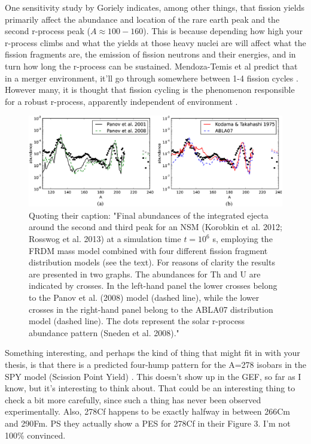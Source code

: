 One sensitivity study by Goriely \cite{Goriely2015a} indicates, among other things, that fission yields primarily affect the abundance and location of the rare earth peak and the second r-process peak ($A\approx100-160$). This is because depending how high your r-process climbs and what the yields at those heavy nuclei are will affect what the fission fragments are, the emission of fission neutrons and their energies, and in turn how long the r-process can be sustained. Mendoza-Temis et al predict that in a merger environment, it'll go through somewhere between 1-4 fission cycles \cite{Mendoza2015}. However many, it is thought that fission cycling is the phenomenon responsible for a robust r-process, apparently independent of environment \cite{Beun2008}.

\begin{figure}
	\centering
	\includegraphics[width=0.9\linewidth]{TeX_files/rProc_abundances}
	\caption[Final r-process abundances for a neutron star merger scenario with different fission fragment distributions.]{Quoting their caption: "Final abundances of the integrated ejecta around the second and third peak for an NSM (Korobkin et al. 2012; Rosswog et al. 2013) at a simulation time $t={10}^{6}$ s, employing the FRDM mass model combined with four different fission fragment distribution models (see the text). For reasons of clarity the results are presented in two graphs. The abundances for Th and U are indicated by crosses. In the left-hand panel the lower crosses belong to the Panov et al. (2008) model (dashed line), while the lower crosses in the right-hand panel belong to the ABLA07 distribution model (dashed line). The dots represent the solar r-process abundance pattern (Sneden et al. 2008)." \cite{Eichler2015}}
	\label{fig:rprocabundances}
\end{figure}


Something interesting, and perhaps the kind of thing that might fit in with your thesis, is that there is a predicted four-hump pattern for the A=278 isobars in the SPY model (Scission Point Yield) \cite{Goriely2013}. This doesn't show up in the GEF, so far as I know, but it's interesting to think about. That could be an interesting thing to check a bit more carefully, since such a thing has never been observed experimentally. Also, 278Cf happens to be exactly halfway in between 266Cm and 290Fm. PS they actually show a PES for 278Cf in their Figure 3. I'm not 100\% convinced.


